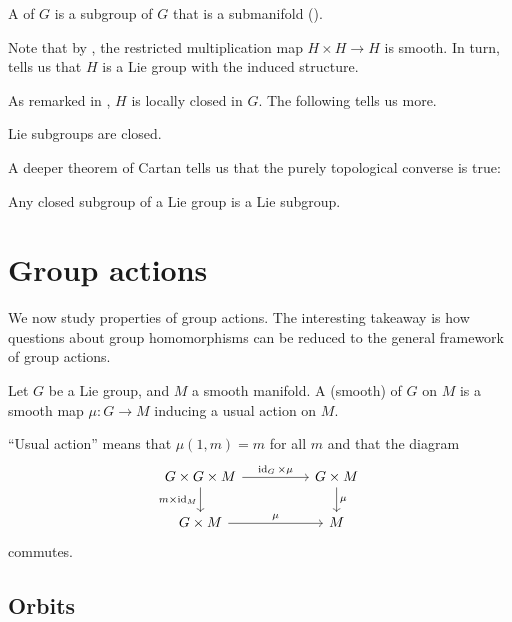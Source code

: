 \documentclass[12pt]{article}
\begin{document}
\begin{defn}
	A  of $G$ is a subgroup of $G$ that is a submanifold ().
\end{defn}
\begin{rem}
	Note that by , the restricted multiplication map $H \times H \to H$ is smooth. 
	In turn,  tells us that $H$ is a Lie group with the induced structure.
\end{rem}

As remarked in , $H$ is locally closed in $G$. The following tells us more.
\begin{thm}
	Lie subgroups are closed.
\end{thm}

A deeper theorem of Cartan tells us that the purely topological converse is true:
\begin{thm}[Cartan]
	Any closed subgroup of a Lie group is a Lie subgroup.
\end{thm}

\section{Group actions}

We now study properties of group actions. The interesting takeaway is how questions about group homomorphisms can be reduced to the general framework of group actions.

\begin{defn}
	Let $G$ be a Lie group, and $M$ a smooth manifold. 
	A (smooth)  of $G$ on $M$ is a smooth map $\mu \colon G \to M$ inducing a usual action on $M$.
\end{defn}
``Usual action'' means that $\mu(1, m) = m$ for all $m$ and that the diagram
\begin{equation*} 
	\begin{tikzcd}
		G \times G \times M \arrow[rr, "\id_{G} \times \mu"] \arrow[d, "m \times \id_{M}"'] && G \times M \arrow[d, "\mu"] \\
		G \times M \arrow[rr, "\mu"] && M
	\end{tikzcd}
\end{equation*}
commutes.

\subsection{Orbits}
\end{document}
